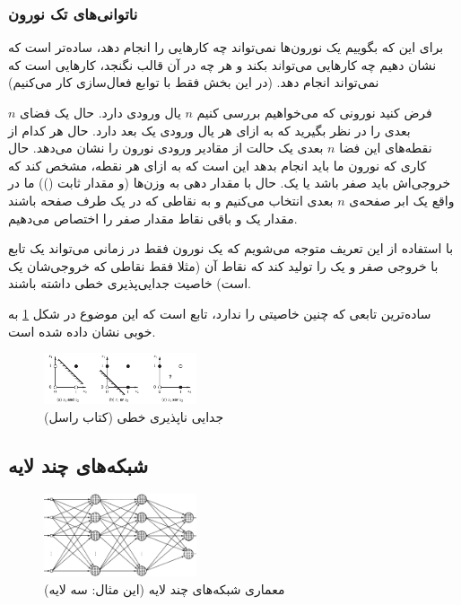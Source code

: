\documentclass[11pt,a4paper,twocolumn]{article}
\begin{document}
\subsubsection{ناتوانی‌های تک نورون}
برای این که بگوییم یک نورون‌ها نمی‌تواند چه کار‌هایی را انجام دهد، ساده‌تر است که نشان دهیم چه کار‌هایی می‌تواند بکند و هر چه در آن قالب نگنجد، کار‌هایی است که نمی‌تواند انجام دهد. (در این بخش فقط با توابع فعال‌سازی  کار می‌کنیم)

فرض کنید نورونی که می‌خواهیم بررسی کنیم $n$ یال ورودی دارد. حال یک فضای $n$ بعدی را در نظر بگیرید که به ازای هر یال ورودی یک بعد دارد. حال هر کدام از نقطه‌های این فضا $n$ بعدی یک حالت از مقادیر ورودی نورون را نشان می‌دهد. حال  کاری که نورون ما باید انجام بدهد این است که به ازای هر نقطه،‌ مشخص کند که خروجی‌اش باید صفر باشد یا یک. حال با مقدار دهی به وزن‌ها (و مقدار ثابت ()) ما در واقع یک ابر صفحه‌ی $n$ بعدی انتخاب می‌کنیم و به نقاطی که در یک طرف صفحه باشند مقدار یک و باقی نقاط مقدار صفر را اختصاص می‌دهیم.\cite{ml-hinton}

با استفاده از این تعریف متوجه می‌شویم که یک نورون فقط در زمانی می‌تواند یک تابع با خروجی صفر و یک را تولید کند که نقاط آن (مثلا فقط نقاطی که خروجی‌شان یک است) خاصیت
جدایی‌پذیری خطی
داشته باشند.

ساده‌ترین تابعی که چنین خاصیتی را ندارد، تابع  است که این موضوع در شکل
\ref{fig:linear_separability}
به خوبی نشان داده شده است.
\begin{figure}
  \centering
    \includegraphics[width=0.4\textwidth]{linear_separability.png}
  \caption{جدایی ناپذیری خطی  (کتاب راسل\cite[ص-۷۳۰]{russell})}
  \label{fig:linear_separability}
\end{figure}

\subsection{شبکه‌های چند لایه}
\label{sec:multilayer}
\begin{figure}
  \centering
    \includegraphics[width=0.4\textwidth]{multilayer.png}
  \caption{ معماری شبکه‌های چند لایه (این مثال: سه لایه)}
  \label{fig:multilayer}
\end{figure}
\end{document}
